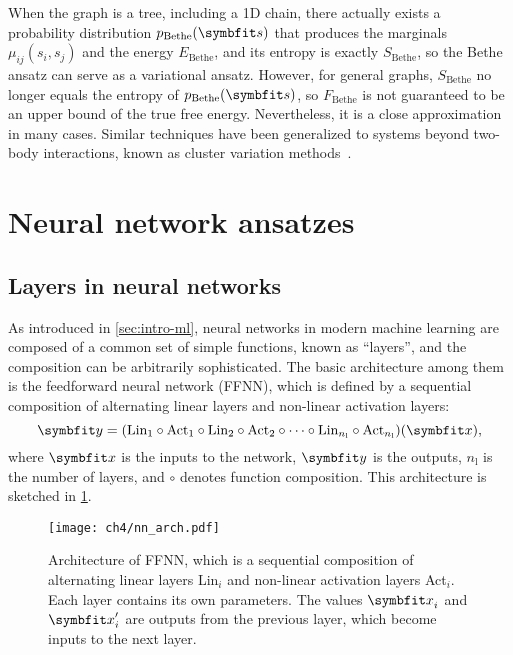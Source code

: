 When the graph is a tree, including a 1D chain, there actually exists a probability distribution $p_\text{Bethe}(\vs)$ that produces the marginals $\mu_{i j}(s_i, s_j)$ and the energy $E_\text{Bethe}$, and its entropy is exactly $S_\text{Bethe}$, so the Bethe ansatz can serve as a variational ansatz. However, for general graphs, $S_\text{Bethe}$ no longer equals the entropy of $p_\text{Bethe}(\vs)$, so $F_\text{Bethe}$ is not guaranteed to be an upper bound of the true free energy. Nevertheless, it is a close approximation in many cases. Similar techniques have been generalized to systems beyond two-body interactions, known as cluster variation methods~\cite{pelizzola2005cluster}.

\section{Neural network ansatzes}
\label{sec:nn}

\subsection{Layers in neural networks}

As introduced in \cref{sec:intro-ml}, neural networks in modern machine learning are composed of a common set of simple functions, known as ``layers'', and the composition can be arbitrarily sophisticated. The basic architecture among them is the feedforward neural network (FFNN), which is defined by a sequential composition of alternating linear layers and non-linear activation layers:
\begin{equation}
\vy = (\text{Lin}_1 \circ \text{Act}_1 \circ \text{Lin}_2 \circ \text{Act}_2 \circ \cdots \circ \text{Lin}_{n_\text{l}} \circ \text{Act}_{n_\text{l}})(\vx),
\label{eq:ffnn}
\end{equation}
where $\vx$ is the inputs to the network, $\vy$ is the outputs, $n_\text{l}$ is the number of layers, and $\circ$ denotes function composition. This architecture is sketched in \cref{fig:nn-arch}.

\begin{figure}[htb]
\centering
\texttt{[image: ch4/nn\_arch.pdf]}
\caption[Architecture of feedforward neural network (FFNN)]{
Architecture of FFNN, which is a sequential composition of alternating linear layers Lin$_i$ and non-linear activation layers Act$_i$. Each layer contains its own parameters. The values $\vx_i$ and $\vx'_i$ are outputs from the previous layer, which become inputs to the next layer.
}
\label{fig:nn-arch}
\end{figure}

